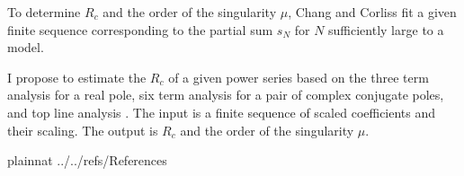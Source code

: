 \documentclass[12pt]{article}
\begin{document}
To determine $R_c$ and the order of the singularity $\mu$,
Chang and Corliss \cite{chang1982} fit a given finite sequence corresponding to the partial sum $s_N$
for $N$ sufficiently large to a model.

I propose to estimate the $R_c$ of a given power series based on the three term analysis
for a real pole, six term analysis for a pair of complex conjugate poles, and top line analysis
\cite[pp.~127--128]{chang1982}. The input is a finite sequence of scaled coefficients
and their scaling. The output is $R_c$ and the order of the singularity $\mu$.

%  
%  
%  

 {plainnat}
 {../../refs/References}
\end{document}
